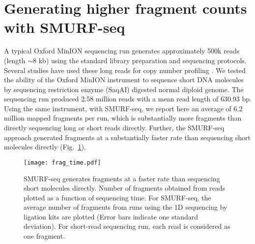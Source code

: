 \section{Generating higher fragment counts with SMURF-seq}
A typical Oxford MinION sequencing run generates approximately 500k
reads (length $\sim$8 kb) \citep{jain2018nanopore,tyson2018minion} using
the standard library preparation and sequencing protocols. Several
studies have used these long reads for copy number profiling
\citep{euskirchen2017same,magi2019nano}.
We tested the ability of the Oxford MinION instrument to sequence short
DNA molecules by sequencing restriction enzyme (SaqAI) digested normal
diploid genome.  The sequencing run produced 2.58 million reads with a
mean read length of 630.93 bp.
Using the same instrument, with SMURF-seq, we report here an average of
6.2 million mapped fragments per run, which is substantially more
fragments than directly sequencing long or short reads directly.
Further, the SMURF-seq approach generated fragments at a substantially
faster rate than sequencing short molecules directly
(Fig.~\ref{frag_time}).

\begin{figure}[t!]
\centering
\texttt{[image: frag\_time.pdf]}
\caption[SMURF-seq generates fragments at a faster rate than
  sequencing short molecules directly.]{
  SMURF-seq generates fragments at a faster rate than sequencing
  short molecules directly. Number of fragments obtained from reads
  plotted as a function of  sequencing time. For SMURF-seq, the average
  number of fragments from runs using the 1D sequencing by ligation kits
  are plotted (Error bars indicate one standard deviation). For short-read
  sequencing run, each read is considered as one fragment.}
\label{frag_time}
\end{figure}

